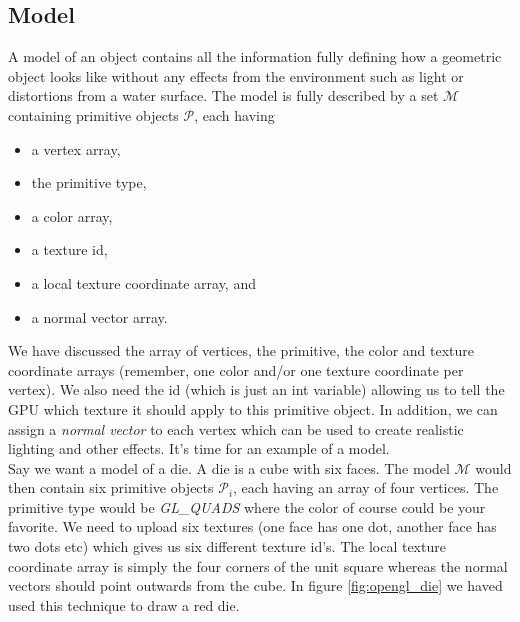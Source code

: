 \subsection{Model}
\label{sec:opengl_model}
A model of an object contains all the information fully defining how a geometric object looks like without any effects from the environment such as light or distortions from a water surface. The model is fully described by a set $\mathcal{M}$ containing primitive objects $\mathcal{P}$, each having 
\begin{itemize}
	\item a vertex array,
	\item the primitive type,
	\item a color array,
	\item a texture id,
	\item a local texture coordinate array, and
	\item a normal vector array.
\end{itemize}
We have discussed the array of vertices, the primitive, the color and texture coordinate arrays (remember, one color and/or one texture coordinate per vertex). We also need the id (which is just an int variable) allowing us to tell the GPU which texture it should apply to this primitive object. In addition, we can assign a \textit{normal vector} to each vertex which can be used to create realistic lighting and other effects. It's time for an example of a model.\\
Say we want a model of a die. A die is a cube with six faces. The model $\mathcal M$ would then contain six primitive objects $\mathcal P_i$, each having an array of four vertices. The primitive type would be \textit{GL\_QUADS} where the color of course could be your favorite. We need to upload six textures (one face has one dot, another face has two dots etc) which gives us six different texture id's. The local texture coordinate array is simply the four corners of the unit square whereas the normal vectors should point outwards from the cube. In figure \ref{fig:opengl_die} we haved used this technique to draw a red die.
